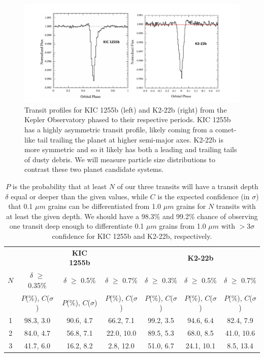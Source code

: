 \documentclass[letterpaper,12pt]{article}
\begin{document}
\begin{figure}
\centering
\includegraphics[width=1.0\textwidth]{transit_profiles.png}
\caption{Transit profiles for KIC 1255b (left) and K2-22b (right) from the Kepler Observatory phased to their respective periods. KIC 1255b has a highly asymmetric transit profile, likely coming from a comet-like tail trailing the planet at higher semi-major axes. K2-22b is more symmetric and so it likely has both a leading and trailing tails of dusty debris. We will measure particle size distributions to contrast these two planet candidate systems.}\label{fig:TransitProfiles}
\end{figure}

\begin{table}[b]
\centering
\begin{tabular}{|c | c c c| c c c|} 
\hline\hline 

	   	&     				& {\bf KIC 1255b}		&				&				& {\bf K2-22b}		&		  		\\
  $N$   	&    $\delta$ $\ge$ 0.35\%	& $\delta$ $\ge$ 0.5\%		& $\delta$ $\ge$ 0.7\%		& $\delta$ $\ge$ 0.3\%		& $\delta$ $\ge$ 0.5\%		& $\delta$ $\ge$ 0.7\%		\\
 	   	&    $P$(\%), $C$($\sigma$)	& $P$(\%), $C$($\sigma$)	& $P$(\%), $C$($\sigma$)	& $P$(\%), $C$($\sigma$)	& $P$(\%), $C$($\sigma$)	& $P$(\%), $C$($\sigma$)		\\
\hline 
\hline
	1	&	98.3, 3.0		& 90.6, 4.7 			& 66.2, 7.1			& 99.2, 3.5			& 94.6, 6.4			& 82.4, 7.9	\\
	2	& 	84.0, 4.7		& 56.8, 7.1			& 22.0, 10.0			& 89.5, 5.3			& 68.0, 8.5			& 41.0, 10.6	\\
	3	& 	41.7, 6.0		& 16.2, 8.2			& 2.8, 12.0			& 51.0, 6.7			& 24.1, 10.1			& 8.5, 13.4	\\

\hline 
\end{tabular}
\caption{$P$ is the probability that at least $N$ of our three
transits will have a transit depth $\delta$ equal or deeper than the given values, while
$C$ is the expected confidence (in $\sigma$) that 0.1 $\mu m$ grains can be differentiated from 1.0 $\mu m$ grains
for $N$ transits with at least the given depth.
We should have a 98.3\% and 99.2\% chance of observing one transit deep enough to 
differentiate 0.1 $\mu m$ grains from 1.0 $\mu m$ with $>$3$\sigma$ confidence
for KIC 1255b and K2-22b, respectively.}
\label{tab:probabilities}
\end{table}
\end{document}
